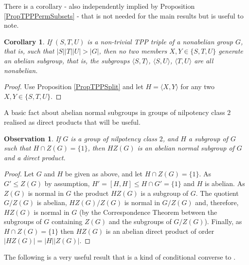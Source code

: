 \documentclass{amsart}
\theoremstyle{observation}
\newtheorem{observation}[theorem]{Observation}
\newtheorem{corollary}[theorem]{Corollary}
\theoremstyle{definition}
\theoremstyle{remark}
\numberwithin{equation}{section}
\begin{document}
There is a corollary - also independently implied by Proposition \ref{PropTPPPermSubsets} - that is not needed for the main results but is useful to note.

\begin{corollary} If $(S, T, U)$ is a non-trivial TPP triple of a nonabelian group $G$, that is, such that $|S||T||U| > |G|$, then no two members $X, Y \in \{S, T, U\}$ generate an abelian subgroup, that is, the subgroups $\langle S, T \rangle$, $\langle S, U \rangle$, $\langle T, U \rangle$ are all nonabelian.
\end{corollary}
\begin{proof} Use Proposition \ref{PropTPPSplit} and let $H = \langle X, Y \rangle$ for any two $X, Y \in \{S, T, U\}$.
\end{proof}

A basic fact about abelian normal subgroups in groups of nilpotency class $2$ realised as direct products that will be useful.

\begin{observation}\label{ObsNilpClassTwo} If $G$ is a group of nilpotency class $2$, and $H$ a subgroup of $G$ such that $H \cap Z(G) = \{1\}$, then $HZ(G)$ is an abelian normal subgroup of $G$ and a direct product.
\end{observation}
\begin{proof}Let $G$ and $H$ be given as above, and let $H \cap Z(G) = \{1\}$. As $G' \leq Z(G)$ by assumption, $H' = [H, H] \leq H \cap G' = \{1\}$ and $H$ is abelian. As $Z(G)$ is normal in $G$ the product $HZ(G)$ is a subgroup of $G$. The quotient $G/Z(G)$ is abelian, $HZ(G)/Z(G)$ is normal in $G/Z(G)$ and, therefore, $HZ(G)$ is normal in $G$ (by the Correspondence Theorem between the subgroups of $G$ containing $Z(G)$ and the subgroups of $G/Z(G)$). Finally, as $H \cap Z(G) = \{1\}$ then $HZ(G)$ is an abelian direct product of order $|HZ(G)| = |H||Z(G)|$.
\end{proof}

The following is a very useful result \citep{Neu2012} that is a kind of conditional converse to \citep[Lemma 2.2]{CU}.
\end{document}
